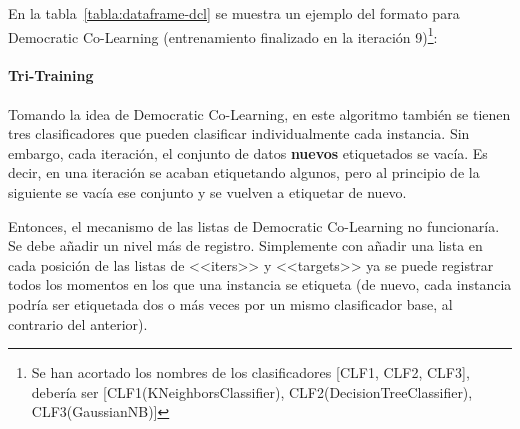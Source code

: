 En la tabla~\ref{tabla:dataframe-dcl} se muestra un ejemplo del formato para
Democratic Co-Learning (entrenamiento finalizado en la iteración 9)\footnote{Se
han acortado los nombres de los clasificadores [CLF1, CLF2, CLF3], debería ser
[CLF1(KNeighborsClassifier), CLF2(DecisionTreeClassifier), CLF3(GaussianNB)]}:
\begin{table}[H]
    \caption{Ejemplo de DataFrame de Democratic Co-Learning}
    \label{tabla:dataframe-dcl}
\end{table}


\paragraph{Tri-Training}
Tomando la idea de Democratic Co-Learning, en este algoritmo también se tienen
tres clasificadores que pueden clasificar individualmente cada instancia. Sin
embargo, cada iteración, el conjunto de datos \textbf{nuevos} etiquetados se
vacía. Es decir, en una iteración se acaban etiquetando algunos, pero al
principio de la siguiente se vacía ese conjunto y se vuelven a etiquetar de
nuevo.

Entonces, el mecanismo de las listas de Democratic Co-Learning no funcionaría.
Se debe añadir un nivel más de registro. Simplemente con añadir una lista en
cada posición de las listas de <<iters>> y <<targets>> ya se puede registrar
todos los momentos en los que una instancia se etiqueta (de nuevo, cada
instancia podría ser etiquetada dos o más veces por un mismo clasificador base,
al contrario del anterior).


